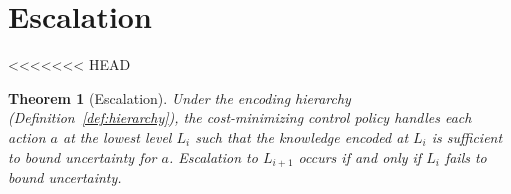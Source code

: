 \documentclass[11pt]{article}
\newtheorem{theorem}{Theorem}
\theoremstyle{definition}
\begin{document}
\section{Escalation}
\label{sec:escalation}

<<<<<<< HEAD
\begin{theorem}[Escalation]
\label{thm:escalation}
Under the encoding hierarchy (Definition~\ref{def:hierarchy}), the
cost-minimizing control policy handles each action $a$ at the lowest
level $L_i$ such that the knowledge encoded at $L_i$ is sufficient to
bound uncertainty for $a$. Escalation to $L_{i+1}$ occurs if and only
if $L_i$ fails to bound uncertainty.
\end{theorem}
\end{document}
